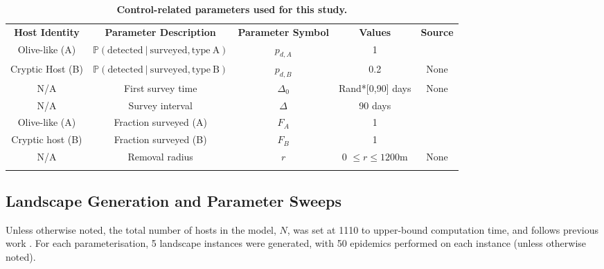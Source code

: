 \documentclass[11pt,letterpaper]{article}
\newlength\savedwidth
\newcommand\thickhline{\noalign{\global\savedwidth\arrayrulewidth\global\arrayrulewidth 2pt}%
\hline
\noalign{\global\arrayrulewidth\savedwidth}}
\begin{document}
\begin{table}
    \centering
    \begin{adjustbox}{width=\textwidth}
    \begin{tabular}{|c|c|c|c|c|}
    \thickhline
        \textbf{Host Identity}  & \textbf{Parameter Description} & \textbf{Parameter Symbol} & \textbf{Values} & \textbf{Source} \\
        \thickhline \thickhline
      Olive-like (A) & $\mathbb{P} \mathrm{(detected\:|\:surveyed,type\:A)}$& $p_{d,A}$& 1 & \cite{Bragard2019} \\   
        \thickhline
         Cryptic Host (B) & $\mathbb{P} \mathrm{(detected\:|\:surveyed, type\:B)}$& $p_{d,B}$& 0.2 & None\\        
        \thickhline
         N/A & First survey time & $\Delta_{0}$& Rand*[0,90] days & None\\
        \thickhline
        N/A & Survey interval & $\Delta$ & 90 days&  \cite{HyattTwynam2017}\\
        \thickhline
         Olive-like (A)& Fraction surveyed (A)  & $F_{A}$ & 1 &  \cite{HyattTwynam2017}\\
        \thickhline
         Cryptic host (B)& Fraction surveyed (B) & $F_{B}$ & 1 & \cite{HyattTwynam2017}\\
        \thickhline
           N/A & Removal radius & $r$ & 0 $\le r \le 1200 $m & None \\
                 \thickhline
    \end{tabular}

    \label{controlparms}
        \end{adjustbox}
    \caption{\textbf{Control-related parameters used for this study.} }
\end{table}

\FloatBarrier
\subsection*{Landscape Generation and Parameter Sweeps}

Unless otherwise noted, the total number of hosts in the model, $N$, was set at 1110 to upper-bound computation time, and follows previous work \cite{HyattTwynam2017}. For each parameterisation, 5 landscape instances were generated, with 50 epidemics performed on each instance (unless otherwise noted). 
\end{document}
